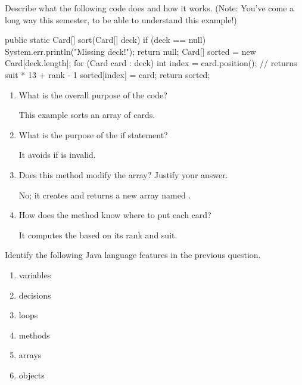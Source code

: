 \Q \label{sort}
 Describe what the following code does and how it works.
(Note: You've come a long way this semester, to be able to understand this example!)

\begin{javalst}
public static Card[] sort(Card[] deck) {
    if (deck == null) {
        System.err.println("Missing deck!");
        return null;
    }
    Card[] sorted = new Card[deck.length];
    for (Card card : deck) {
        int index = card.position();  // returns suit * 13 + rank - 1
        sorted[index] = card;
    }
    return sorted;
}
\end{javalst}

\vspace{-1ex}
\begin{enumerate}

\item What is the overall purpose of the code?
\begin{answer}[1em]
This example sorts an array of cards.
\end{answer}

\item What is the purpose of the if statement?
\begin{answer}[1em]
It avoids  if  is invalid.
\end{answer}

\item Does this method modify the  array? Justify your answer.
\begin{answer}[1em]
No; it creates and returns a new array named .
\end{answer}

\item How does the  method know where to put each card?
\begin{answer}[1em]
It computes the  based on its rank and suit.
\end{answer}

\end{enumerate}
\vspace{-1ex}


\Q Identify the following Java language features in the previous question.

\setlength{\defaultwidth}{15em}

\begin{minipage}{22.5em}
\begin{enumerate}

\item variables
\hfill {}
\item decisions
\hfill {}
\item loops
\hfill {}
\item methods
\hfill {}
\item arrays
\hfill {}
\item objects
\hfill {}

\end{enumerate}
\end{minipage}
